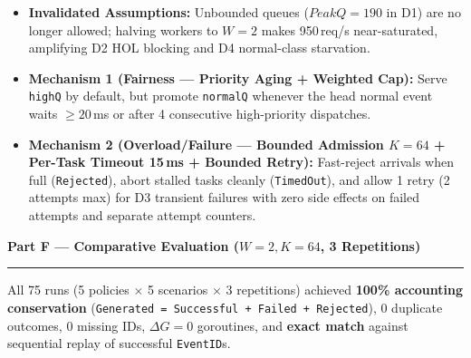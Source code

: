 \documentclass[11pt]{article}
\newcommand{\partheader}[1]{%
    \vspace{0.9em}%
    {\noindent\fontsize{13.5}{16}\selectfont\textbf{\color{accentblue}#1}\par}%
    \vspace{0.2em}\hrule\vspace{0.65em}%
}
\begin{document}
\begin{itemize}
    \item \textbf{Invalidated Assumptions:} Unbounded queues ($PeakQ=190$ in D1) are no longer allowed; halving workers to $W=2$ makes 950\,req/s near-saturated, amplifying D2 HOL blocking and D4 normal-class starvation.
    \item \textbf{Mechanism 1 (Fairness --- Priority Aging + Weighted Cap):} Serve \texttt{highQ} by default, but promote \texttt{normalQ} whenever the head normal event waits $\ge 20$\,ms or after 4 consecutive high-priority dispatches.
    \item \textbf{Mechanism 2 (Overload/Failure --- Bounded Admission $K=64$ + Per-Task Timeout 15\,ms + Bounded Retry):} Fast-reject arrivals when full (\texttt{Rejected}), abort stalled tasks cleanly (\texttt{TimedOut}), and allow 1 retry (2 attempts max) for D3 transient failures with zero side effects on failed attempts and separate attempt counters.
\end{itemize}

\newpage
\partheader{Part F --- Comparative Evaluation ($W=2, K=64$, 3 Repetitions)}

All 75 runs (5 policies $\times$ 5 scenarios $\times$ 3 repetitions) achieved \textbf{100\% accounting conservation} (\texttt{Generated = Successful + Failed + Rejected}), 0 duplicate outcomes, 0 missing IDs, $\Delta G = 0$ goroutines, and \textbf{exact match} against sequential replay of successful \texttt{EventID}s.
\end{document}
